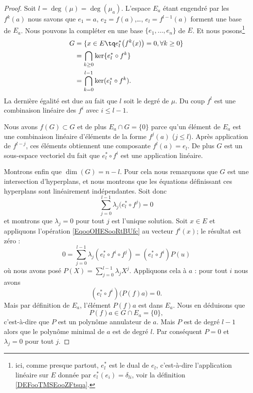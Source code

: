 \begin{proof}
    Soit \( l=\deg(\mu)=\deg(\mu_a)\). L'espace \( E_a\) étant engendré par les \( f^k(a)\) nous savons que \( e_1=a\), \( e_2=f(a)\),\ldots, \( e_l=f^{l-1}(a)\) forment une base de \( E_a\). Nous pouvons la compléter en une base \( \{ e_1,\ldots, e_n \}\) de \( E\). Et nous posons\footnote{ici, comme presque partout, \( e^*_{l}\) est le dual de \( e_l\), c'est-à-dire l'application linéaire sur \( E\) donnée par \( e^*_l(e_i)=\delta_{li}\), voir la définition \ref{DEFooTMSEooZFtsqa}.}
    \begin{subequations}
        \begin{align}
            G & = \{ x\in E\tq e^*_l\big( f^k(x) \big)=0, \forall k\geq 0 \}\\
              & = \bigcap_{k\geq 0}\ker\{ e^*_l\circ f^k \}                 \\
              & = \bigcap_{k=0}^{l-1}\ker( e^*_l\circ f^k ).
        \end{align}
    \end{subequations}
    La dernière égalité est due au fait que \( l\) soit le degré de \( \mu\). Du coup \( f^l\) est une combinaison linéaire des \( f^i\) avec \( i\leq l-1\).

    Nous avons \( f(G)\subset G\) et de plus \( E_a\cap G=\{ 0 \}\) parce qu'un élément de \( E_a\) est une combinaison linéaire d'éléments de la forme \( f^j(a)\) (\( j\leq l\)). Après application de \( f^{l-j}\), ces éléments obtiennent une composante \( f^l(a)=e_l\). De plus \( G\) est un sous-espace vectoriel du fait que \( e^*_l\circ f^i\) est une application linéaire.

    Montrons enfin que \( \dim(G)=n-l\). Pour cela nous remarquons que \( G\) est une intersection d'hyperplans, et nous montrons que les équations définissant ces hyperplans sont linéairement indépendantes. Soit donc
    \begin{equation}        \label{EqooOHESooRtBUfc}
        \sum_{j=0}^{l-1}\lambda_j\big( e^*_l\circ f^j \big)=0
    \end{equation}
    et montrons que \( \lambda_j=0\) pour tout $j$ est l'unique solution. Soit \( x\in E\) et appliquons l'opération \eqref{EqooOHESooRtBUfc} au vecteur \( f^i(x)\); le résultat est zéro :
    \begin{equation}
        0=\sum_{j=0}^{l-1}\lambda_j(e^*_l\circ f^i\circ f^j)=(e^*_l\circ f^i)P(u)
    \end{equation}
    où nous avons posé \( P(X)=\sum_{j=0}^{l-1}\lambda_jX^j\). Appliquons cela à \( a\) : pour tout \( i\) nous avons
    \begin{equation}
        (e^*_l\circ f^i)\big( P(f)a \big)=0.
    \end{equation}
    Mais par définition de \( E_a\), l'élément \(P(f)a \) est dans \( E_a\). Nous en déduisons que
    \begin{equation}
        P(f)a\in G\cap E_a=\{ 0 \},
    \end{equation}
    c'est-à-dire que \( P\) est un polynôme annulateur de \( a\). Mais \( P\) est de degré \( l-1\) alors que le polynôme minimal de \( a\) est de degré \( l\). Par conséquent \( P=0\) et \( \lambda_j=0\) pour tout \( j\).
\end{proof}

